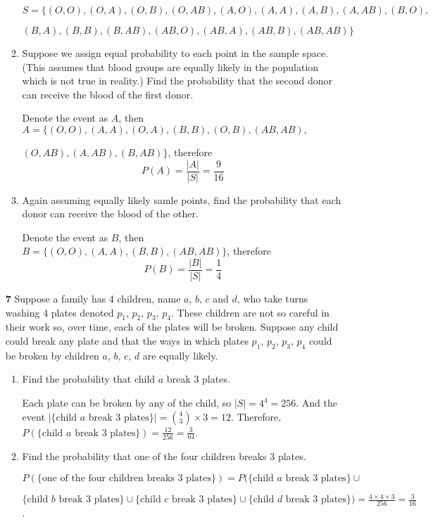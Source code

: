\documentclass[letter]{article}
\begin{document}
\begin{itemize}[leftmargin = 0 em]
\begin{enumerate}[label = (\alph*), leftmargin = 0em]
		$S = \{(O, O), (O, A), (O, B), (O, AB), (A, O), (A, A), (A, B), (A, AB), (B, O), $

		$(B, A), (B, B), (B, AB), (AB, O), (AB, A), (AB, B), (AB, AB)\}$
		\item Suppose we assign equal probability to each point in the sample space. (This assumes that blood groups are equally likely in the population which is not true in reality.) Find the probability that the second donor can receive the blood of the first donor.

		Denote the event as $A$, then $A = \{(O, O), (A, A), (O, A), (B, B), (O, B), (AB, AB),$

		$ (O, AB), (A, AB), (B, AB)\}$, therefore
		\[P(A) = \frac{|A|}{|S|} = \frac{9}{16}\]
		\item Again assuming equally likely samle points, find the probability that each donor can receive the blood of the other.

		Denote the event as $B$, then $B = \{(O, O), (A, A), (B, B), (AB, AB)\}$, therefore
		\[P(B) = \frac{|B|}{|S|} = \frac{1}{4}\]
	\end{enumerate}
	

	\item [\bf 7] Suppose a family has 4 children, name $a,\, b,\, c$
 and $d$, who take turns washing 4 plates denoted $p_1,\, p_2,\, p_3,\, p_4$. These children are not so careful in their work so, over time, each of the plates will be broken. Suppose any child could break any plate and that the ways in which plates $p_1,\, p_2,\, p_3,\,p_4$ could be broken by children $a,\, b,\, c,\, d$ are equally likely.
 \begin{enumerate}[label = (\alph*), leftmargin = 0em]
 	\item Find the probability that child $a$ break 3 plates.

 	Each plate can be broken by any of the child, so $|S| = 4^4 = 256$. And the event $|\{\textrm{child $a$ break 3 plates}\}| = \binom{4}{3}\times 3 = 12$. Therefore, $P(\{\textrm{child $a$ break 3 plates}\}) = \frac{12}{256} = \frac{3}{64}$.

 	\item Find the probability that one of the four children breaks 3 plates.

 	$P(\{\textrm{one of the four children breaks 3 plates}\}) = P(\{\textrm{child $a$ break 3 plates}\} \cup $

 	$\{\textrm{child $b$ break 3 plates}\}\cup \{\textrm{child $c$ break 3 plates}\}\cup \{\textrm{child $d$ break 3 plates}\}) = \frac{4\times 4\times 3}{256} = \frac{3}{16}$.
 \end{enumerate}
 
 	\end{itemize}
	
	
	
	
\end{document}
